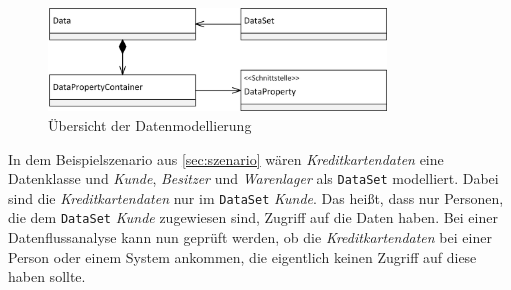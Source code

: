 \begin{figure}[h]
	\centering
  	\includegraphics[width=0.8\textwidth]{images/meta_data.png}
	\caption{Übersicht der Datenmodellierung}
	\label{img:modell:data}
\end{figure}
In dem Beispielszenario aus \autoref{sec:szenario} wären \textit{Kreditkartendaten}  eine Datenklasse und \textit{Kunde}, \textit{Besitzer} und \textit{Warenlager} als \texttt{DataSet} modelliert. Dabei sind die \textit{Kreditkartendaten} nur im \texttt{DataSet} \textit{Kunde}. Das heißt, dass nur Personen, die dem \texttt{DataSet} \textit{Kunde} zugewiesen sind, Zugriff auf die Daten haben. Bei einer Datenflussanalyse kann nun geprüft werden, ob die \textit{Kreditkartendaten} bei einer Person oder einem System ankommen, die eigentlich keinen Zugriff auf diese haben sollte. 

